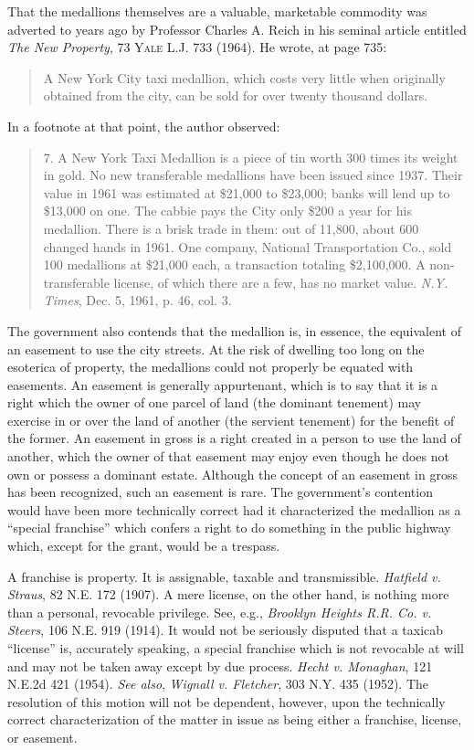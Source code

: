 That the medallions themselves are a valuable, marketable commodity was adverted
to years ago by Professor Charles A. Reich in his seminal article entitled
\textit{The New Property}, 73 \textsc{Yale L.J.} 733 (1964).
He wrote, at page 735:
\begin{quote}
A New York City taxi medallion, which costs very little when originally obtained
from the city, can be sold for over twenty thousand dollars.
\end{quote}
In a footnote at that point, the author observed:
\begin{quote}
7. A New York Taxi Medallion is a piece of tin worth 300 times its weight in
gold. No new transferable medallions have been issued since 1937. Their value
in 1961 was estimated at \$21,000 to \$23,000; banks will lend up to \$13,000
on one. The cabbie pays the City only \$200 a year for his medallion. There is
a brisk trade in them: out of 11,800, about 600 changed hands in 1961. One
company, National Transportation Co., sold 100 medallions at \$21,000 each, a
transaction totaling \$2,100,000. A non-transferable license, of which there
are a few, has no market value. \textit{N.Y. Times}, Dec. 5, 1961, p. 46, col.
3.
\end{quote}

The government also contends that the medallion is, in essence, the equivalent
of an easement to use the city streets. At the risk of dwelling too long on the
esoterica of property, the medallions could not properly be equated with
easements. An easement is generally appurtenant, which is to say that it is a
right which the owner of one parcel of land (the dominant tenement) may
exercise in or over the land of another (the servient tenement) for the benefit
of the former. An easement in gross is a right created in a person to use the
land of another, which the owner of that easement may enjoy even though he does
not own or possess a dominant estate. Although the concept of an easement in
gross has been recognized, such an easement is rare. The government's
contention would have been more technically correct had it characterized the
medallion as a ``special franchise'' which confers a right to do something in
the public highway which, except for the grant, would be a trespass. 

A franchise is property. It is assignable, taxable and transmissible.
\textit{Hatfield v. Straus}, 82 N.E. 172 (1907). A mere license, on the other
hand, is nothing more than a personal, revocable privilege. See, e.g.,
\textit{Brooklyn Heights R.R. Co. v. Steers}, 106 N.E. 919 (1914). It would not
be seriously disputed that a taxicab ``license'' is, accurately speaking, a
special franchise which is not revocable at will and may not be taken away
except by due process. \textit{Hecht v. Monaghan}, 121 N.E.2d 421 (1954).
\textit{See also}, \textit{Wignall v. Fletcher}, 303 N.Y. 435 (1952). The
resolution of this motion will not be dependent, however, upon the technically
correct characterization of the matter in issue as being either a franchise,
license, or easement.

